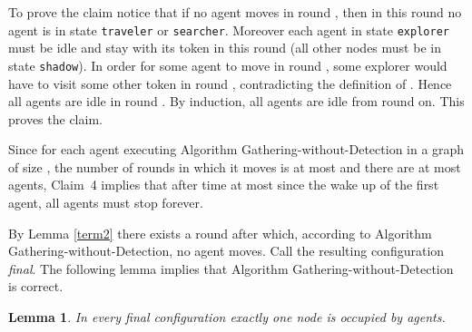 \documentclass[11pt]{article}
\newtheorem{lemma}{Lemma}[section]
\newcommand{\finclaim}{\hfill }
\newcommand{\qed}{\hfill  \bigbreak}
\newenvironment{proof}{\noindent {\bf Proof.}}{\qed}
\begin{document}
\begin{proof}
      To prove the claim notice that if no agent moves in round , then in this round no agent is in state {\tt traveler} or {\tt searcher}.
      Moreover each agent in state  {\tt explorer} must be idle and stay with its token in this round (all other nodes must be in state {\tt shadow}).
      In order for some agent to move in round , some explorer would have to visit some other token in round , contradicting the definition of .
      Hence all agents are idle in round . By induction, all agents are idle from round  on. This proves the claim.\finclaim
      


      Since for each agent executing Algorithm Gathering-without-Detection in a graph of size , the number of rounds in which it moves is at most 
      and there are at most  agents, {Claim~4} implies that after time at most   since the wake up of the first agent, all agents must stop forever.
    \end{proof} 
    
    By Lemma \ref{term2} there exists a round after which, according to Algorithm Gathering-without-Detection,  no agent moves.
    Call the resulting configuration {\em final}. The following lemma implies  that  Algorithm Gathering-without-Detection is correct.
    
    \begin{lemma}\label{cor}
    In every final configuration exactly one node is occupied by agents. 
    \end{lemma}
    
\end{document}
